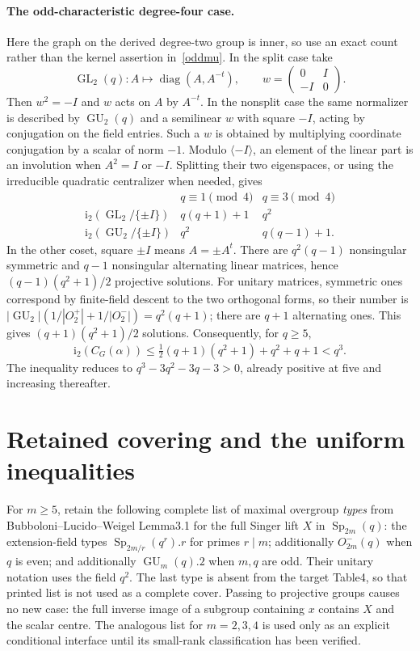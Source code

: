 \documentclass[10pt]{article}
\newcommand{\ii}{\mathrm i_2}\newcommand{\nuu}{\nu_2}\newcommand{\F}{\mathbb F}\newcommand{\GL}{\operatorname{GL}}\newcommand{\GU}{\operatorname{GU}}\newcommand{\Sp}{\operatorname{Sp}}\newcommand{\PSp}{\operatorname{PSp}}\newcommand{\PGSp}{\operatorname{PGSp}}\newcommand{\Aut}{\operatorname{Aut}}
\begin{document}
\paragraph{The odd-characteristic degree-four case.}
Here the graph on the derived degree-two group is inner, so use an exact
count rather than the kernel assertion in~\eqref{oddmu}. In the split
case take
\[
 \GL_2(q): A\mapsto\operatorname{diag}(A,A^{-t}),\qquad
 w=\begin{pmatrix}0&I\\-I&0\end{pmatrix}.
\]
Then $w^2=-I$ and $w$ acts on $A$ by $A^{-t}$. In the nonsplit case the
same normalizer is described by $\GU_2(q)$ and a semilinear $w$ with square
$-I$, acting by conjugation on the field entries. Such a $w$ is obtained
by multiplying coordinate conjugation by a scalar of norm $-1$.
Modulo $\langle-I\rangle$, an element of the linear part is an involution
when $A^2=I$ or $-I$. Splitting their two eigenspaces, or using the
irreducible quadratic centralizer when needed, gives
\[
\begin{array}{c|cc}
& q\equiv1\pmod4&q\equiv3\pmod4\\\hline
\ii(\GL_2/\{\pm I\})&q(q+1)+1&q^2\\
\ii(\GU_2/\{\pm I\})&q^2&q(q-1)+1.
\end{array}
\]
In the other coset, square $\pm I$ means $A=\pm A^t$.
There are $q^2(q-1)$ nonsingular symmetric and $q-1$ nonsingular alternating
linear matrices, hence $(q-1)(q^2+1)/2$ projective solutions. For unitary
matrices, symmetric ones correspond by finite-field descent to the two
orthogonal forms, so their number is
$|\GU_2|(1/|O_2^+|+1/|O_2^-|)=q^2(q+1)$; there are $q+1$ alternating
ones. This gives $(q+1)(q^2+1)/2$ solutions. Consequently, for $q\ge5$,
\begin{equation}\label{mu4odd}
 \ii(C_G(\alpha))\le\tfrac12(q+1)(q^2+1)+q^2+q+1<q^3.
\end{equation}
The inequality reduces to $q^3-3q^2-3q-3>0$, already positive at five
and increasing thereafter.

\section{Retained covering and the uniform inequalities}
For $m\ge5$, retain the following complete list of maximal overgroup
\emph{types} from Bubboloni--Lucido--Weigel Lemma3.1 for the full Singer
lift $X$ in $\Sp_{2m}(q)$: the extension-field types
$\Sp_{2m/r}(q^r).r$ for primes $r\mid m$; additionally $O^-_{2m}(q)$
when $q$ is even; and additionally $\GU_m(q).2$ when $m,q$ are odd.
Their unitary notation uses the field $q^2$. The last type is absent from
the target Table4, so that printed list is not used as a complete cover.
Passing to projective groups causes no new case: the full inverse image
of a subgroup containing $x$ contains $X$ and the scalar centre.
The analogous list for $m=2,3,4$ is used only as an explicit conditional
interface until its small-rank classification has been verified.
\end{document}
